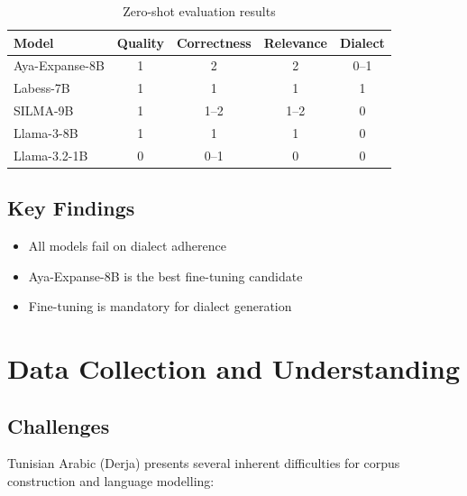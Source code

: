 \documentclass[12pt,a4paper]{report}
\begin{document}
\begin{table}[h]
\centering
\begin{tabular}{lcccc}
\toprule
Model & Quality & Correctness & Relevance & Dialect \\
\midrule
Aya-Expanse-8B & 1 & 2 & 2 & 0--1 \\
Labess-7B & 1 & 1 & 1 & 1 \\
SILMA-9B & 1 & 1--2 & 1--2 & 0 \\
Llama-3-8B & 1 & 1 & 1 & 0 \\
Llama-3.2-1B & 0 & 0--1 & 0 & 0 \\
\bottomrule
\end{tabular}
\caption{Zero-shot evaluation results}
\end{table}

\subsection{Key Findings}

\begin{itemize}
    \item All models fail on dialect adherence
    \item Aya-Expanse-8B is the best fine-tuning candidate
    \item Fine-tuning is mandatory for dialect generation
\end{itemize}%


\section{Data Collection and Understanding}

\subsection{Challenges}

Tunisian Arabic (Derja) presents several inherent difficulties for corpus construction
and language modelling:
\end{document}

